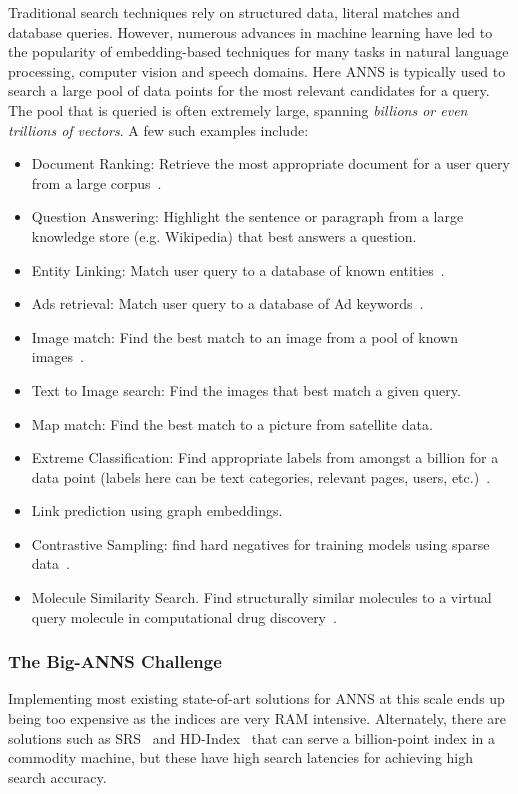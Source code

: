 Traditional search techniques rely on structured data, literal matches
and database queries.  However, numerous advances in machine learning
have led to the popularity of embedding-based techniques for many
tasks in natural language processing, computer vision and speech
domains.  Here ANNS is typically used to search a large pool of
data points for the most relevant candidates for a query. The pool that
is queried is often extremely large, spanning \emph{billions or even
  trillions of vectors}. A few such examples include:
\begin{itemize}
  \item Document Ranking: Retrieve the most appropriate document for a
    user query from a large corpus~\cite{trec19dl}.
  \item Question Answering: Highlight the sentence or paragraph from a
    large knowledge store (e.g. Wikipedia) that best answers a
    question.
  \item Entity Linking: Match user query to a database of known entities~\cite{bennett2007netflix}.
  \item Ads retrieval: Match user query to a database of Ad keywords~\cite{twinbert20}.
  \item Image match: Find the best match to an image from a pool of
    known images~\cite{douze2016polysemous,FBAI2020covidmisinfo}.
  \item Text to Image search: Find the images that best match a given query.
  \item Map match: Find the best match to a picture from satellite data.
  \item Extreme Classification: Find appropriate labels from amongst a
    billion for a data point (labels here can be text categories,
    relevant pages, users,
    etc.)~\cite{jain2019slice,nigam2019semantic, DeepXML21, GalaXC21}.
  \item Link prediction using graph embeddings. 
  \item Contrastive Sampling: find hard negatives for training models
    using sparse data~\cite{conneau2017word, ance20}.
  \item Molecule Similarity Search. Find structurally similar
    molecules to a virtual query molecule in computational drug
    discovery~\cite{pmlr-v119-ryali20a,Samanta2020.06.26.172908,C7SC02664A}.
\end{itemize}

\subsubsection{The Big-ANNS Challenge} 
Implementing most existing state-of-art solutions for ANNS at this
scale ends up being too expensive as the indices are very RAM
intensive. Alternately, there are solutions such as SRS~\cite{Sun14}
and HD-Index~\cite{Arora18} that can serve a billion-point index in a
commodity machine, but these have high search latencies for achieving
high search accuracy.

